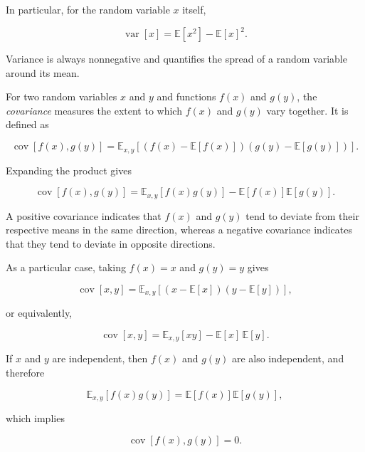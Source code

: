 \documentclass[10pt,twocolumn]{memoir}
\begin{document}
In particular, for the random variable $x$ itself,

\begin{equation}
    \operatorname{var}[x] = \mathbb{E}[x^2] - \mathbb{E}[x]^2.
\end{equation}

Variance is always nonnegative and quantifies the spread of a random variable around its mean.

For two random variables $x$ and $y$ and functions $f(x)$ and $g(y)$, the \textit{covariance} measures the extent to which $f(x)$ and $g(y)$ vary together. It is defined as

\begin{equation}
    \operatorname{cov}[f(x),g(y)] = \mathbb{E}_{x,y} \left[\left(f(x)-\mathbb{E}[f(x)]\right) \left(g(y)-\mathbb{E}[g(y)]\right)\right].
\end{equation}

Expanding the product gives

\begin{equation}
    \operatorname{cov}[f(x),g(y)] = \mathbb{E}_{x,y}[f(x)g(y)] - \mathbb{E}[f(x)]\mathbb{E}[g(y)].
\end{equation}

A positive covariance indicates that $f(x)$ and $g(y)$ tend to deviate from their respective means in the same direction, whereas a negative covariance indicates that they tend to deviate in opposite directions.

As a particular case, taking $f(x)=x$ and $g(y)=y$ gives

\begin{equation}
    \operatorname{cov}[x,y] = \mathbb{E}_{x,y} \left[\left(x-\mathbb{E}[x]\right)\left(y-\mathbb{E}[y]\right)\right],
\end{equation}

or equivalently,

\begin{equation}
    \operatorname{cov}[x,y] = \mathbb{E}_{x,y}[xy] - \mathbb{E}[x]\,\mathbb{E}[y].
\end{equation}

If $x$ and $y$ are independent, then $f(x)$ and $g(y)$ are also independent, and therefore

\begin{equation}
\mathbb{E}_{x,y}[f(x)g(y)] = \mathbb{E}[f(x)]\mathbb{E}[g(y)],
\end{equation}

which implies

\begin{equation}
    \operatorname{cov}[f(x),g(y)] = 0.
\end{equation}
\end{document}
